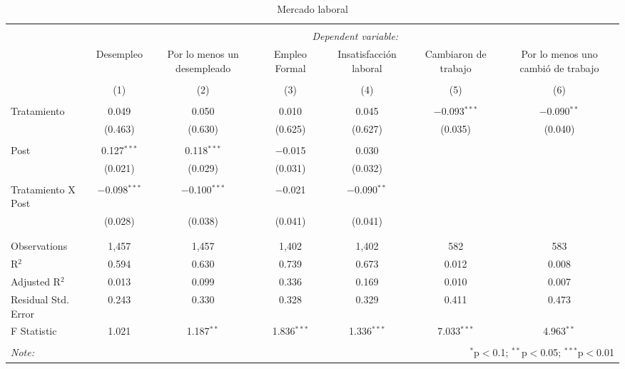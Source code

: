 
\begin{table}[H] \centering 
  \caption{Mercado laboral} 
  \label{reg_laboral} 
\tiny 
\begin{tabular}{@{\extracolsep{-7pt}}lcccccc} 
\\[-1.8ex]\hline 
\hline \\[-1.8ex] 
 & \multicolumn{6}{c}{\textit{Dependent variable:}} \\ 
\cline{2-7} 
 & Desempleo & Por lo menos un desempleado & Empleo Formal & Insatisfacción laboral & Cambiaron de trabajo & Por lo menos uno cambió de trabajo \\ 
\\[-1.8ex] & (1) & (2) & (3) & (4) & (5) & (6)\\ 
\hline \\[-1.8ex] 
 Tratamiento & 0.049 & 0.050 & 0.010 & 0.045 & $-$0.093$^{***}$ & $-$0.090$^{**}$ \\ 
  & (0.463) & (0.630) & (0.625) & (0.627) & (0.035) & (0.040) \\ 
  & & & & & & \\ 
 Post & 0.127$^{***}$ & 0.118$^{***}$ & $-$0.015 & 0.030 &  &  \\ 
  & (0.021) & (0.029) & (0.031) & (0.032) &  &  \\ 
  & & & & & & \\ 
 Tratamiento X Post & $-$0.098$^{***}$ & $-$0.100$^{***}$ & $-$0.021 & $-$0.090$^{**}$ &  &  \\ 
  & (0.028) & (0.038) & (0.041) & (0.041) &  &  \\ 
  & & & & & & \\ 
\hline \\[-1.8ex] 
Observations & 1,457 & 1,457 & 1,402 & 1,402 & 582 & 583 \\ 
R$^{2}$ & 0.594 & 0.630 & 0.739 & 0.673 & 0.012 & 0.008 \\ 
Adjusted R$^{2}$ & 0.013 & 0.099 & 0.336 & 0.169 & 0.010 & 0.007 \\ 
Residual Std. Error & 0.243 & 0.330 & 0.328 & 0.329 & 0.411 & 0.473 \\ 
F Statistic & 1.021 & 1.187$^{**}$ & 1.836$^{***}$ & 1.336$^{***}$ & 7.033$^{***}$ & 4.963$^{**}$ \\ 
\hline 
\hline \\[-1.8ex] 
\textit{Note:}  & \multicolumn{6}{r}{$^{*}$p$<$0.1; $^{**}$p$<$0.05; $^{***}$p$<$0.01} \\ 
\end{tabular} 
\end{table} 
